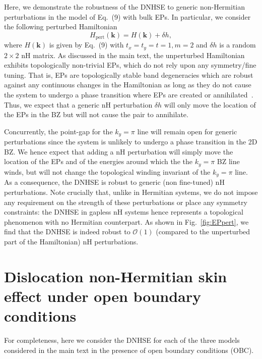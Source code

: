 \documentclass[prb,reprint,twocolumn,preprintnumbers,amsmath,amssymb,showpacs,nofootinbib,superscriptaddress]{revtex4-2}
\newcommand{\bs}[1]{\boldsymbol{#1}}
\begin{document}
Here, we demonstrate the robustness of the DNHSE to generic non-Hermitian perturbations in the model of Eq.~(9) with bulk EPs. In particular, we consider the following perturbed Hamiltonian
\begin{equation}
\label{eq:EPHampert}
    H_{\mathrm{pert}}(\bs{k}) = H(\bs{k}) + \delta h, 
\end{equation}
where $H(\bs{k})$ is given by Eq.~(9) with $t_x = t_y = t = 1, m=2$ and $\delta h$ is a random $2\times 2$ nH matrix. As discussed in the main text, the unperturbed Hamiltonian exhibits topologically non-trivial EPs, which do not rely upon any symmetry/fine tuning. That is, EPs are topologically stable band degeneracies which are robust against any continuous changes in the Hamiltonian as long as they do not cause the system to undergo a phase transition where EPs are created or annihilated~\cite{kawabata2019semi}. Thus, we expect that a generic nH perturbation $\delta h$ will only move the location of the EPs in the BZ but will not cause the pair to annihilate.

Concurrently, the point-gap for the $k_y = \pi$ line will remain open for generic perturbations since the system is unlikely to undergo a phase transition in the 2D BZ. We hence expect that adding a nH perturbation will simply move the location of the EPs and of the energies around which the the $k_y = \pi$ BZ line winds, but will not change the topological winding invariant of the $k_y = \pi$ line. As a consequence, the DNHSE is robust to generic (non fine-tuned) nH perturbations. Note crucially that, unlike in Hermitian systems, we do not impose any requirement on the strength of these perturbations or place any symmetry constraints: the DNHSE in gapless nH systems hence represents a topological phenomenon with no Hermitian counterpart. As shown in Fig.~\ref{fig:EPpert}, we find that the DNHSE is indeed robust to $\mathcal{O}(1)$ (compared to the unperturbed part of the Hamiltonian) nH perturbations.


\section{Dislocation non-Hermitian skin effect under open boundary conditions }
\label{sec:OBC}

For completeness, here we consider the DNHSE for each of the three models considered in the main text in the presence of open boundary conditions (OBC). 
\end{document}
